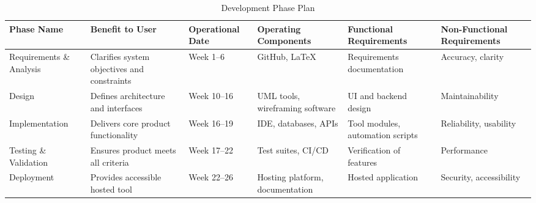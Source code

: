 \documentclass[12pt]{article}
\newcommand{\lips}{\textit{Insert your content here.}}
\begin{document}
\begin{table}[H]
\centering
\caption{Development Phase Plan}
\begin{tabularx}{\textwidth}{|p{2.5cm}|X|p{2cm}|X|X|X|}
\hline
\textbf{Phase Name} & \textbf{Benefit to User} & \textbf{Operational Date} & \textbf{Operating Components} & \textbf{Functional Requirements} & \textbf{Non-Functional Requirements} \\ \hline
Requirements \& Analysis & Clarifies system objectives and constraints & Week 1–6 & GitHub, LaTeX & Requirements documentation & Accuracy, clarity \\ \hline
Design & Defines architecture and interfaces & Week 10–16 & UML tools, wireframing software & UI and backend design & Maintainability \\ \hline
Implementation & Delivers core product functionality & Week 16–19 & IDE, databases, APIs & Tool modules, automation scripts & Reliability, usability \\ \hline
Testing \& Validation & Ensures product meets all criteria & Week 17–22 & Test suites, CI/CD & Verification of features & Performance \\ \hline
Deployment & Provides accessible hosted tool & Week 22–26 & Hosting platform, documentation & Hosted application & Security, accessibility \\ \hline
\end{tabularx}
\end{table}


\end{document}
